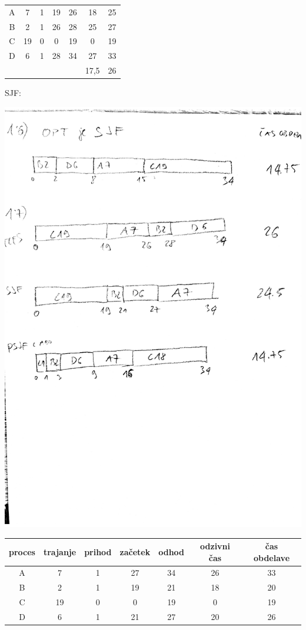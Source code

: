{\begin{center}
\begin{tabular}{c|cc|cc|cc}
\hline
A &   7 &  1 & 19 & 26 & 18 & 25 \\
B &   2 &  1 & 26 & 28 & 25 & 27 \\
C & 19 & 0 &  0 & 19 & 0 & 19 \\
D &   6 & 1 & 28 & 34 & 27 & 33 \\
\hline
& & & & & 17,5 & 26
\end{tabular}
\end{center}
SJF:
\begin{center}
\includegraphics[width=.9\textwidth]{razvrscanje/1.7-SJF.pdf}\\
\begin{tabular}{c|cc|cc|cc}
proces & trajanje & prihod & začetek & odhod & odzivni čas & čas obdelave \\
\hline
A &   7 &  1 & 27 & 34 & 26 & 33 \\
B &   2 &  1 & 19 & 21 & 18 & 20 \\
C & 19 & 0 &  0 & 19 & 0 & 19 \\
D &   6 & 1 & 21 & 27 & 20 & 26 \\

\end{tabular}
\end{center}}
